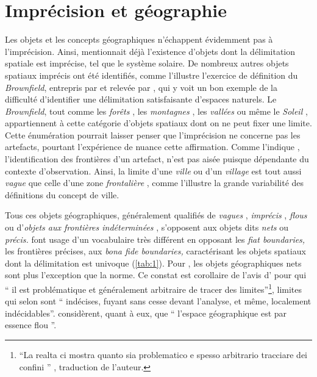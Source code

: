 \section{Imprécision et géographie}

Les objets et les concepts géographiques n’échappent évidemment pas à
l’imprécision. Ainsi, \textcite{Russell1923} mentionnait déjà
l’existence d’objets dont la délimitation spatiale est imprécise, tel
que le système solaire. De nombreux autres objets spatiaux imprécis
ont été identifiés, comme l’illustre l’exercice de définition du
\emph{Brownfield}, entrepris par \textcite{Alker2000} et relevée par
\textcite{Bennett2001}, qui y voit un bon exemple de la difficulté
d’identifier une délimitation satisfaisante d’espaces naturels. Le
\emph{Brownfield}, tout comme les \emph{forêts}
\autocite{Bennett2001,Dilo2006,Fisher2006}, les \emph{montagnes}
\autocite{Varzi2001,Fisher2006,Chaudhry2008}, les \emph{vallées}
\autocite{Schneider2003} ou même le \emph{Soleil}
\autocite{Simons1999}, appartiennent à cette catégorie d’objets
spatiaux dont on ne peut fixer une limite. Cette énumération pourrait
laisser penser que l’imprécision ne concerne pas les artefacts,
pourtant l’expérience de  nuance cette affirmation. Comme
l’indique \textcite{Campari1996}, l’identification des frontières d’un
artefact, n’est pas aisée puisque dépendante du contexte
d’observation. Ainsi, la limite d’une \emph{ville} ou d’un
\emph{village} est tout aussi \emph{vague} que celle d’une zone
\emph{frontalière} \autocite{Varzi2001,Fisher2006}, comme l’illustre
la grande variabilité des définitions du concept de ville.

Tous ces objets géographiques, généralement qualifiés de \emph{vagues}
\autocite{Erwig1997}, \emph{imprécis} \autocite{Winter2000},
\emph{flous} \autocite{Lagacherie1996} ou d’\emph{objets aux
  frontières indéterminées} \autocite{Burrough1996}, s’opposent aux
objets dits \emph{nets} \autocite{Schneider2001} ou \emph{précis.}
\textcite{Smith2000} font usage d’un vocabulaire très différent en
opposant les \emph{fiat boundaries,} \ie les frontières précises, aux
\emph{bona fide boundaries,} caractérisant les objets spatiaux dont la
délimitation est univoque (\ref{tab:1}). Pour
\textcite{Couclelis1996}, les objets géographiques nets sont plus
l’exception que la norme. Ce constat est corollaire de l’avis d’
\textcite{OddAmbrosetti1987} pour qui \enquote{\textelp{} il est
  problématique et généralement arbitraire de tracer des
  limites\textelp{}}\footnote{\foreignquote{italian}{La realta ci
    mostra quanto sia problematico e spesso arbitrario tracciare dei
    confini \textelp{}} \autocite[200]{OddAmbrosetti1987}, traduction
  de l’auteur.}, limites qui selon \textcite[106]{Brunet2001} sont
\enquote{\textelp{} indécises, fuyant sans cesse devant l’analyse, et
  même, localement indécidables}. \textcite{Dutozia1994} considèrent,
quant à eux, que \enquote{\textelp{} l’espace géographique est par
  essence flou \textelp{}}.

